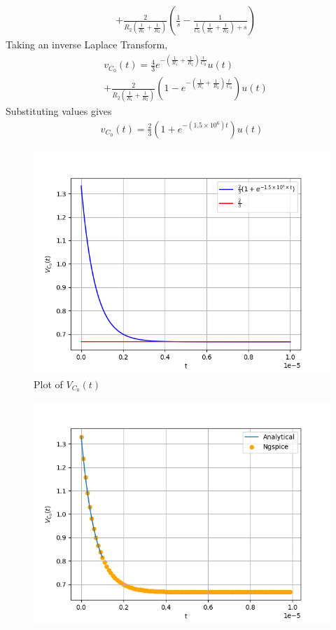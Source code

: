 \documentclass[journal,12pt,twocolumn]{IEEEtran}
\providecommand{\brak}[1]{\ensuremath{\left(#1\right)}}
\numberwithin{equation}{section}
\renewcommand\thesection{\arabic{section}}
\begin{document}
\begin{enumerate}[label=\arabic*.,ref=\thesection.\theenumi]
\begin{align}
			&+ \frac{2}{R_2\brak{\frac{1}{R_1} +\frac{1}{R_2}}}\brak{\frac{1}{s} - \frac{1}{\frac{1}{C_0}\brak{\frac{1}{R_1} + \frac{1}{R_2}} + s}}
		\end{align}
		Taking an inverse Laplace Transform,
		\begin{align}
			&v_{C_0}(t) = \frac{4}{3}e^{-\brak{\frac{1}{R_1} + \frac{1}{R_2}}\frac{t}{C_0}}u(t) \nonumber \\ 
			&+ \frac{2}{R_2\brak{\frac{1}{R_1}+\frac{1}{R_2}}}\brak{1 - e^{-\brak{\frac{1}{R_1} + \frac{1}{R_2}}\frac{t}{C_0}}}u(t)
		\end{align}
		Substituting values gives
		\begin{align}
			v_{C_0}(t) = \frac{2}{3}\brak{1 +e^{-\brak{1.5 \times 10^6}t}}u(t)
			\label{eq:v2-t}
		\end{align}
		\begin{figure}[!ht]
			\centering
			\includegraphics[width=\columnwidth]{figs/3_4.png}
			\caption{Plot of $V_{C_0}(t)$}
		\end{figure}
		\begin{figure}[!ht]
			\centering
			\includegraphics[width=\columnwidth]{figs/3_5.png}

\end{figure}
\end{enumerate}
\end{document}
